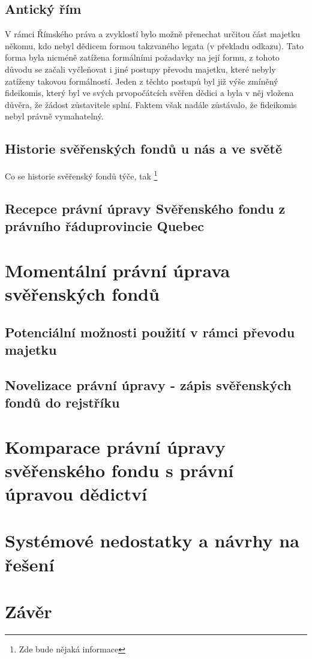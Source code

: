 \documentclass{article}
\begin{document}
\newpage

\subsection{Antický řím}

V rámci Římského práva a zvyklostí bylo možně přenechat určitou část majetku někomu, kdo nebyl dědicem formou takzvaného legata (v překladu odkazu). Tato forma byla nicméně zatížena formálními požadavky na její formu, z tohoto důvodu se začali vyčleňovat i jiné postupy převodu majetku, které nebyly zatíženy takovou formálností. Jeden z těchto postupů byl již výše zmíněný fideikomis, který byl ve svých prvopočátcích svěřen dědici a byla v něj vložena důvěra, že žádost zůstavitele splní. Faktem však nadále zůstávalo, že fideikomis nebyl právně vymahatelný.

\subsection{Historie svěřenských fondů u nás a ve světě}

Co se historie svěřenský fondů týče, tak \footnote[4]{Zde bude nějaká informace}

\subsection{Recepce právní úpravy Svěřenského fondu z právního řáduprovincie Quebec}

\newpage
\pagestyle{fancy}

\section{Momentální právní úprava svěřenských fondů}

\subsection{Potenciální možnosti použití v rámci převodu majetku}

\subsection{Novelizace právní úpravy - zápis svěřenských fondů do rejstříku}

\newpage

\thispagestyle{smallertextinheader}

\section{Komparace právní úpravy svěřenského fondu s právní úpravou dědictví}

\newpage
\pagestyle{fancy}

\section{Systémové nedostatky a návrhy na řešení}

\newpage

\section{Závěr}

\newpage
\printbibheading
\printbibliography[type=misc,heading=subbibliography,title={Online sources}]
\printbibliography[type=book,heading=subbibliography,title={Other sources}]
	
\end{document}
